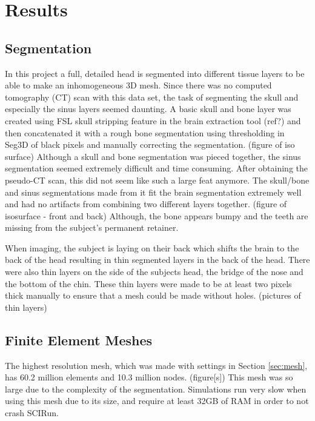 %

\section{Results}
\label{sec:results}

\subsection{Segmentation}

In this project a full, detailed head is segmented into different tissue layers to be able to make an inhomogeneous 3D mesh. Since there was no computed tomography (CT) scan with this data set, the task of segmenting the skull and especially the sinus layers seemed daunting. A basic skull and bone layer was created using FSL skull stripping feature in the brain extraction tool (ref?) and then concatenated it with a rough bone segmentation using thresholding in Seg3D of black pixels and manually correcting the segmentation. (figure of iso surface) Although a skull and bone segmentation was pieced together, the sinus segmentation seemed extremely difficult and time consuming. After obtaining the pseudo-CT scan, this did not seem like such a large feat anymore. The skull/bone and sinus segmentations made from it fit the brain segmentation extremely well and had no artifacts from combining two different layers together. (figure of isosurface - front and back) Although, the bone appears bumpy and the teeth are missing from the subject's permanent retainer.

When imaging, the subject is laying on their back which shifts the brain to the back of the head resulting in thin segmented layers in the back of the head. There were also thin layers on the side of the subjects head, the bridge of the nose and the bottom of the chin. These thin layers were made to be at least two pixels thick manually to ensure that a mesh could be made without holes. (pictures of thin layers)

\subsection{Finite Element Meshes}

The highest resolution mesh, which was made with settings in Section \ref{sec:mesh}, has 60.2 million elements and 10.3 million nodes. (figure[s]) This mesh was so large due to the complexity of the segmentation. Simulations run very slow when using this mesh due to its size, and require at least 32GB of RAM in order to not crash SCIRun. 

